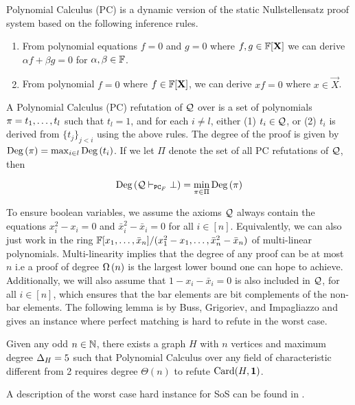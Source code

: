 \documentclass[11pt]{article}
\begin{document}
Polynomial Calculus (PC) is a dynamic version of the static Nullstellensatz proof system \citep[Section 1.3]{fleming2019semialgebraic} based on the following inference rules.
\begin{enumerate}
	\item From polynomial equations $f=0$ and $g=0$ where $f,g \in \mathbb{F}[\mathbf{X}]$ we can derive $\alpha f + \beta g = 0$ for $\alpha, \beta \in \mathbb{F}$.
	\item From polynomial $f=0$ where $f \in \mathbb{F}[\mathbf{X}]$, we can derive $xf=0$ where $x \in \vec{X}$.
\end{enumerate}

\begin{definition}\label{def:poly-calc-refutations}
A Polynomial Calculus (PC) refutation of $\mathcal{Q}$ over is a set of polynomials $\pi = t_1, \dots, t_l$	such that $t_l = 1$, and for each $i \neq l$, either (1) $t_i \in \mathcal{Q}$, or (2) $t_i$ is derived from $\{t_j\}_{j < i}$ using the above rules.
The degree of the proof is given by $\text{Deg}\left(\pi\right) = \max_{i \in l}\text{Deg}\left(t_i\right)$. If we let $\Pi$ denote the set of all PC refutations of $\mathcal{Q}$, then

\[ \text{Deg}\left(\mathcal{Q} \vdash_{\texttt{PC}_F} \bot\right) = \min_{\pi \in \Pi}\text{Deg}\left(\pi\right)\]
\end{definition}

To ensure boolean variables, we assume the axioms $\mathcal{Q}$ always contain the equations $x_i^2 - x_i=0$ and $\bar{x}^2_i - \bar{x}_i = 0$ for all $i \in [n]$. 
Equivalently, we can also just work in the ring $\mathbb{F}[x_1, \dots, \bar{x}_n]/(x_1^2 - x_1, \dots, \bar{x}_n^2 - \bar{x}_n)$ of multi-linear polynomials.
Multi-linearity implies that the degree of any proof can be at most $n$ i.e a proof of degree $\Omega\left(n\right)$ is the largest lower bound one can hope to achieve.
Additionally, we will also assume that $1 - x_i - \bar{x}_i=0$ is also included in $\mathcal{Q}$, for all $i \in [n]$, which ensures that the bar elements are bit complements of the non-bar elements.
The following lemma is by Buss, Grigoriev, and Impagliazzo \cite{buss1999linear} and gives an instance where perfect matching is hard to refute in the worst case. 

\begin{lemma}\label{lemma:worst-case-instance-PC}Given any odd $n \in \mathbb{N}$, there exists a graph $H$ with $n$ vertices and maximum degree $\Delta_{H}= 5$ such that Polynomial Calculus over any field of characteristic different from 2 requires degree $\Theta(n)$ to refute $\text{Card}(H, \mathbf{1})$.
\end{lemma}
A description of the  worst case hard instance for SoS can be found in \citep[Theorem A.3]{Austrin_2022}.
\end{document}
